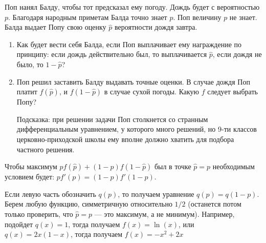 \begin{problem}
Поп нанял Балду, чтобы тот предсказал ему погоду. Дождь будет с
вероятностью $p$. Благодаря народным приметам Балда точно знает
$p$. Поп величину $p$ не знает. Балда выдает Попу
свою оценку $\hat{p}$ вероятности дождя завтра. \par
\begin{enumerate}
\item  Как будет вести себя Балда, если Поп выплачивает ему
награждение по принципу: если дождь действительно был, то
выплачивается $\hat{p}$, если дождя не было, то
$1-\hat{p}$? \par
\item Поп решил заставить Балду выдавать точные оценки. В случае
дождя Поп платит $f(\hat{p})$, и $f(1-\hat{p})$ в случае
сухой погоды. Какую $f$ следует выбрать Попу? \par
Подсказка: при решении задачи Поп столкнется со странным
дифференциальным уравнением, у которого много решений, но 9-ти
классов церковно-приходской школы ему вполне должно хватить для
подбора частного решения.
\end{enumerate}


\begin{sol}

Чтобы максимум $p f(\hat{p})+(1-p)f(1-\hat{p})$ был в точке
$\hat{p}=p$ необходимым условием будет:
$pf'(p)=(1-p)f'(1-p)$. \par
Если левую часть обозначить $q(p)$, то получаем уравнение
$q(p)=q(1-p)$. Берем любую функцию, симметричную относительно
$1/2$ (останется потом только проверить, что $\hat{p}=p$ --- это
максимум, а не минимум). Например, подойдет $q(x)=1$, тогда
получаем $f(x)=\ln(x)$, или $q(x)=2x(1-x)$, тогда получаем
$f(x)=-x^{2}+2x$
\end{sol}
\end{problem}



